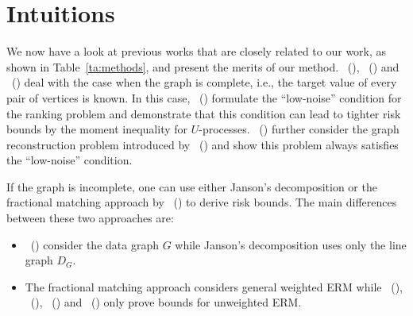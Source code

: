\documentclass[letterpaper]{article} %
\newcommand{\problemabbr}{\textnormal{C}\textsc{lanet}}
\newcommand{\citet}[1]{\citeauthor{#1}\ (\citeyear{#1})}
\begin{document}
\section{Intuitions} %
\label{sub:intiution_and_examples}

We now have a look at previous works that are closely related to our work, as shown in Table~\ref{ta:methods}, and present the merits of our method. 
\citet{Biau2006}, \citet{clemenccon2008ranking} and \citet{papa2016graph} deal with the case when the graph is complete, i.e., the target value of every pair of vertices is known. 
In this case, \citet{clemenccon2008ranking} formulate the ``low-noise'' condition for the ranking problem and demonstrate that this condition can lead to tighter risk bounds by the moment inequality for $U$-processes.
\citet{papa2016graph} further consider the graph reconstruction problem introduced by \citet{Biau2006} and show this problem always satisfies the ``low-noise'' condition. 

If the graph is incomplete, one can use either Janson's decomposition \cite{janson2004large,Usunier2005,ralaivola2009chromatic,DBLP:conf/icml/RalaivolaA15} or the fractional matching approach by \citet{wang2017learning} to derive risk bounds. 
The main differences between these two approaches are: 
\begin{itemize}
  \item \citet{wang2017learning} consider the data graph $G$ while Janson's decomposition uses only the line graph $D_G$. 
  \item The fractional matching approach considers general weighted ERM while \citet{janson2004large}, \citet{Usunier2005}, \citet{ralaivola2009chromatic} and \citet{DBLP:conf/icml/RalaivolaA15} only prove bounds for unweighted ERM.
\end{itemize}
\end{document}
